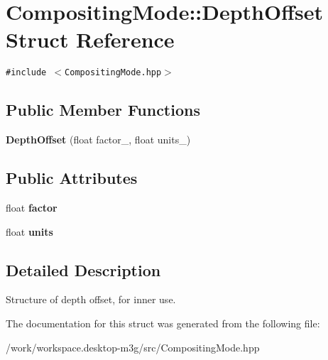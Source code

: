 \hypertarget{structm3g_1_1CompositingMode_1_1DepthOffset}{
\section{CompositingMode::DepthOffset Struct Reference}
\label{structm3g_1_1CompositingMode_1_1DepthOffset}
}
{\tt \#include $<$CompositingMode.hpp$>$}

\subsection*{Public Member Functions}
\begin{CompactItemize}
\item 
\hypertarget{structm3g_1_1CompositingMode_1_1DepthOffset_5bca742cc2bf312b60933a538d3d4107}{
\textbf{DepthOffset} (float factor\_\-, float units\_\-)}
\label{structm3g_1_1CompositingMode_1_1DepthOffset_5bca742cc2bf312b60933a538d3d4107}

\end{CompactItemize}
\subsection*{Public Attributes}
\begin{CompactItemize}
\item 
\hypertarget{structm3g_1_1CompositingMode_1_1DepthOffset_323c112c11500270be91b7cb353826bd}{
float \textbf{factor}}
\label{structm3g_1_1CompositingMode_1_1DepthOffset_323c112c11500270be91b7cb353826bd}

\item 
\hypertarget{structm3g_1_1CompositingMode_1_1DepthOffset_1c0298a96a707800b8223cbf532ab42c}{
float \textbf{units}}
\label{structm3g_1_1CompositingMode_1_1DepthOffset_1c0298a96a707800b8223cbf532ab42c}

\end{CompactItemize}


\subsection{Detailed Description}
Structure of depth offset, for inner use. 

The documentation for this struct was generated from the following file:\begin{CompactItemize}
\item 
/work/workspace.desktop-m3g/src/CompositingMode.hpp\end{CompactItemize}
